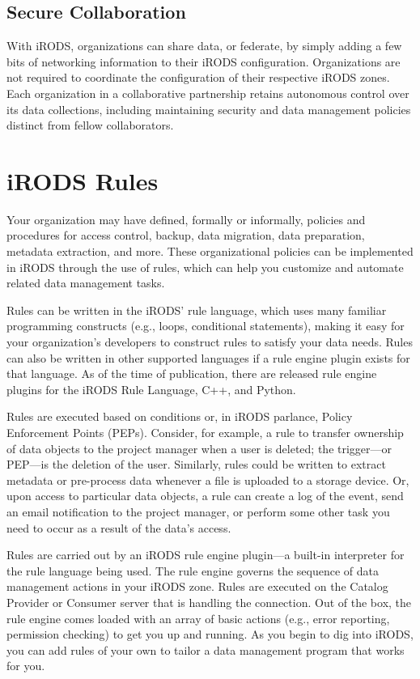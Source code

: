 \documentclass[10pt,oneside]{memoir}
\begin{document}
\subsection{Secure Collaboration}

With iRODS, organizations can share data, or federate, by simply adding a few bits of networking information to their iRODS configuration. Organizations are not required to coordinate the configuration of their respective iRODS zones. Each organization in a collaborative partnership retains autonomous control over its data collections, including maintaining security and data management policies distinct from fellow collaborators.

\section{iRODS Rules}

Your organization may have defined, formally or informally, policies and procedures for access control, backup, data migration, data preparation, metadata extraction, and more. These organizational policies can be implemented in iRODS through the use of rules, which can help you customize and automate related data management tasks.

Rules can be written in the iRODS' rule language, which uses many familiar programming constructs (e.g., loops, conditional statements), making it easy for your organization's developers to construct rules to satisfy your data needs.  Rules can also be written in other supported languages if a rule engine plugin exists for that language.  As of the time of publication, there are released rule engine plugins for the iRODS Rule Language, C++, and Python.

Rules are executed based on conditions or, in iRODS parlance, Policy Enforcement Points (PEPs). Consider, for example, a rule to transfer ownership of data objects to the project manager when a user is deleted; the trigger---or PEP---is the deletion of the user. Similarly, rules could be written to extract metadata or pre-process data whenever a file is uploaded to a storage device. Or, upon access to particular data objects, a rule can create a log of the event, send an email notification to the project manager, or perform some other task you need to occur as a result of the data's access.

Rules are carried out by an iRODS rule engine plugin---a built-in interpreter for the rule language being used. The rule engine governs the sequence of data management actions in your iRODS zone. Rules are executed on the Catalog Provider or Consumer server that is handling the connection. Out of the box, the rule engine comes loaded with an array of basic actions (e.g., error reporting, permission checking) to get you up and running. As you begin to dig into iRODS, you can add rules of your own to tailor a data management program that works for you.
\end{document}
